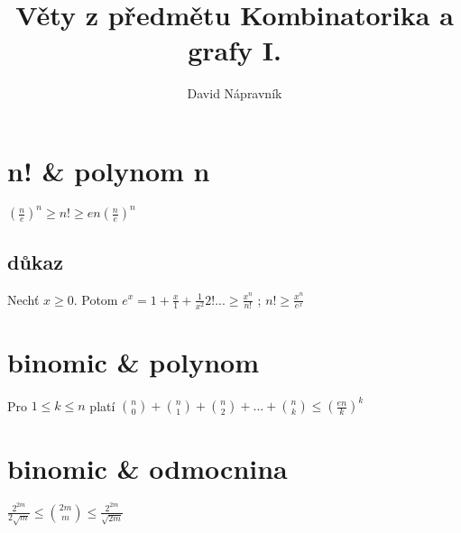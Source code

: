 \documentclass[10pt,a4paper]{article}
\begin{document}
\title{Věty z předmětu Kombinatorika a grafy I.}
\author{David Nápravník}
\maketitle


\tableofcontents
\section{n! \& polynom n}
$
(\frac{n}{e})^n \geq n! \geq en(\frac{n}{e})^n
$
\subsection*{důkaz}
Nechť $x \geq 0$. Potom $e^x = 1 + \frac{x}{1}+\frac1{x^2}{2!} ... \geq \frac{x^n}{n!}$ ; $n! \geq \frac{x^n}{e^x}$

\section{binomic \& polynom}
Pro $ 1 \leq k \leq n $ platí
$
\binom{n}{0}+\binom{n}{1}+\binom{n}{2}+...+\binom{n}{k} \leq (\frac{en}{k})^k
$

\section{binomic \& odmocnina}
$
\frac{2^{2m}}{2\sqrt{m}} \leq
\binom{2m}{m} \leq
\frac{2^{2m}}{\sqrt{2m}}
$
\end{document}

